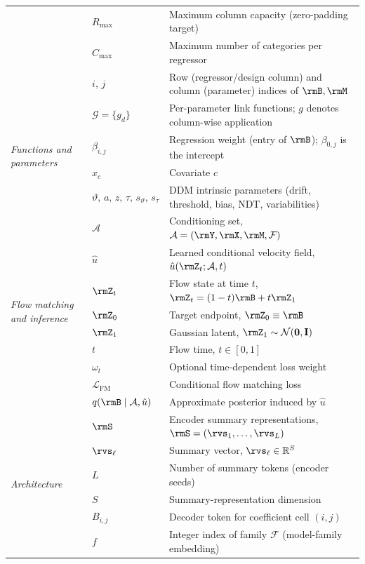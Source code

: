 \begin{table}[t]
\begin{tabularx}{\linewidth}{@{}p{2.4cm} l >{\raggedright\arraybackslash}X@{}}
 & $R_{\mathrm{max}}$ & Maximum column capacity (zero-padding target) \\
 & $C_{\mathrm{max}}$ & Maximum number of categories per regressor \\
 & $i,\,j$ & Row (regressor/design column) and column (parameter) indices of $\rmB,\rmM$ \\
\midrule
\multirow{4}{=}{\textit{Functions and parameters}}
 & $\mathcal{G}=\{g_d\}$ & Per-parameter link functions; $g$ denotes column-wise application \\
 & $\beta_{i,j}$ & Regression weight (entry of $\rmB$); $\beta_{0,j}$ is the intercept \\
 & $x_c$ & Covariate $c$ \\
 & $\vartheta,\,a,\,z,\,\tau,\,s_{\vartheta},\,s_{\tau}$ & DDM intrinsic parameters (drift, threshold, bias, NDT, variabilities) \\
\midrule
\multirow{9}{=}{\textit{Flow matching and inference}}
 & $\mathcal{A}$ & Conditioning set, $\mathcal{A}=(\rmY,\rmX,\rmM,\mathcal{F})$ \\
 & $\hat{u}$ & Learned conditional velocity field, $\hat{u}(\rmZ_t;\mathcal{A},t)$ \\
 & $\rmZ_t$ & Flow state at time $t$, $\rmZ_t=(1-t)\rmB+t\rmZ_1$ \\
 & $\rmZ_0$ & Target endpoint, $\rmZ_0 \equiv \rmB$ \\
 & $\rmZ_1$ & Gaussian latent, $\rmZ_1\sim\mathcal{N}(\mathbf{0},\mathbf{I})$ \\
 & $t$ & Flow time, $t\in[0,1]$ \\
 & $\omega_t$ & Optional time-dependent loss weight \\
 & $\mathcal{L}_{\mathrm{FM}}$ & Conditional flow matching loss \\
 & $q(\rmB\mid\mathcal{A},\hat{u})$ & Approximate posterior induced by $\hat{u}$ \\
\midrule
\multirow{6}{=}{\textit{Architecture}}
 & $\rmS$ & Encoder summary representations, $\rmS=(\rvs_1,\dots,\rvs_L)$ \\
 & $\rvs_{\ell}$ & Summary vector, $\rvs_{\ell}\in\mathbb{R}^{S}$ \\
 & $L$ & Number of summary tokens (encoder seeds) \\
 & $S$ & Summary-representation dimension \\
 & $B_{i,j}$ & Decoder token for coefficient cell $(i,j)$ \\
 & $f$ & Integer index of family $\mathcal{F}$ (model-family embedding) \\
\bottomrule
\end{tabularx}
\end{table}
